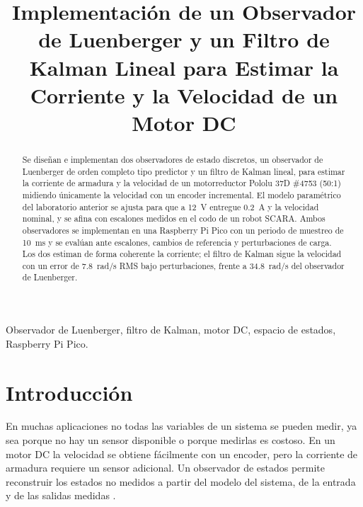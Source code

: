 \documentclass[conference,a4paper]{IEEEtran}
\begin{document}
\title{Implementación de un Observador de Luenberger y un Filtro de Kalman Lineal para Estimar la Corriente y la Velocidad de un Motor DC}

\author{
}

\maketitle

\begin{abstract}
Se diseñan e implementan dos observadores de estado discretos, un observador de Luenberger de orden completo tipo predictor y un filtro de Kalman lineal, para estimar la corriente de armadura y la velocidad de un motorreductor Pololu 37D \#4753 (50:1) midiendo únicamente la velocidad con un encoder incremental. El modelo paramétrico del laboratorio anterior se ajusta para que a \SI{12}{V} entregue \SI{0.2}{A} y la velocidad nominal, y se afina con escalones medidos en el codo de un robot SCARA. Ambos observadores se implementan en una Raspberry Pi Pico con un periodo de muestreo de \SI{10}{ms} y se evalúan ante escalones, cambios de referencia y perturbaciones de carga. Los dos estiman de forma coherente la corriente; el filtro de Kalman sigue la velocidad con un error de \SI{7.8}{rad/s} RMS bajo perturbaciones, frente a \SI{34.8}{rad/s} del observador de Luenberger.
\end{abstract}

\begin{IEEEkeywords}
Observador de Luenberger, filtro de Kalman, motor DC, espacio de estados, Raspberry Pi Pico.
\end{IEEEkeywords}

\section{Introducción}
En muchas aplicaciones no todas las variables de un sistema se pueden medir, ya sea porque no hay un sensor disponible o porque medirlas es costoso. En un motor DC la velocidad se obtiene fácilmente con un encoder, pero la corriente de armadura requiere un sensor adicional. Un observador de estados permite reconstruir los estados no medidos a partir del modelo del sistema, de la entrada y de las salidas medidas \cite{ogata}.
\end{document}
